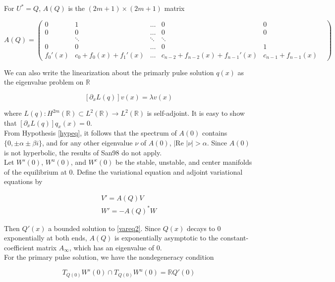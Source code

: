 \documentclass[12pt]{article}
\def\R{{\mathbb R}}
\begin{document}
For $U^* = Q$, $A(Q)$ is the $(2m+1) \times (2m+1)$ matrix

\begin{equation}
A(Q) = \begin{pmatrix}
0 & 1 & \dots & 0 & 0 \\
0 & 0 & \dots & 0 & 0 \\
& \ddots & \ddots & \ddots & & \\
0 & 0 & \dots & 0 & 1 \\
f_0'(x) & c_0 + f_0(x) + f_1'(x) & \dots & c_{n-2} + f_{n-2}(x) + f_{n-1}'(x) & c_{n-1} + f_{n-1}(x)
\end{pmatrix}
\end{equation}

We can also write the linearization about the primarly pulse solution $q(x)$ as the eigenvalue problem on $\R$

\begin{equation}\label{eigonR}
[ \partial_x L(q) ] v(x) = \lambda v(x)
\end{equation}

where $L(q): H^{2m}(\R) \subset L^2(\R) \rightarrow L^2(\R)$ is self-adjoint. It is easy to show that $[ \partial_x L(q) ] q_x(x) = 0$.
\\

From Hypothesis \ref{hypeq}, it follows that the spectrum of $A(0)$ contains $\{ 0, \pm \alpha \pm \beta i\}$, and for any other eigenvalue $\nu$ of $A(0)$, $|\text{Re }|\nu| > \alpha$. Since $A(0)$ is not hyperbolic, the results of San98 do not apply.\\

Let $W^s(0)$, $W^u(0)$, and $W^c(0)$ be the stable, unstable, and center manifolds of the equilibrium at 0. Define the variational equation and adjoint variational equations by

\begin{align}
V' = A(Q) V \label{vareq2} \\
W' = -A(Q)^* W \label{adjvareq2}
\end{align}

Then $Q'(x)$ a bounded solution to \eqref{vareq2}. Since $Q(x)$ decays to 0 exponentially at both ends, $A(Q)$ is exponentially asymptotic to the constant-coefficient matrix $A_\infty$, which has an eigenvalue of 0. \\

For the primary pulse solution, we have the nondegeneracy condition

\begin{equation}\label{nondegen2}
T_{Q(0)}W^s(0) \cap T_{Q(0)}W^u(0) = \R Q'(0)
\end{equation}
\end{document}
